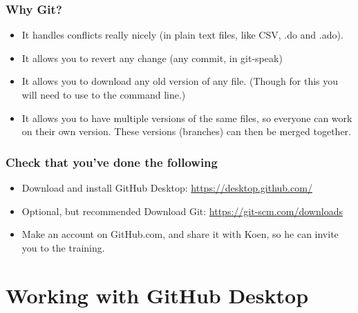 \documentclass{beamer}
\begin{document}

\begin{frame}
	\frametitle{Why Git?}
	\begin{itemize}
		\item It handles conflicts really nicely (in plain text files, like CSV, .do and .ado).
		\item It allows you to revert any change (any commit, in git-speak)
		\item It allows you to download any old version of any file. (Though for this you will need to use to the command line.)
		\item It allows you to have multiple versions of the same files, so everyone can work on their own version. These versions (branches) can then be merged together.
	\end{itemize}
\end{frame}


\begin{frame}
\frametitle{Check that you've done the following}
	\begin{itemize}
		\item Download and install GitHub Desktop: \url{https://desktop.github.com/}
		\item Optional, but recommended Download Git: \url{https://git-scm.com/downloads} 
		\item Make an account on GitHub.com, and share it with Koen, so he can invite you to the training.
	\end{itemize}
\end{frame}

\section{Working with GitHub Desktop}

\end{document}
